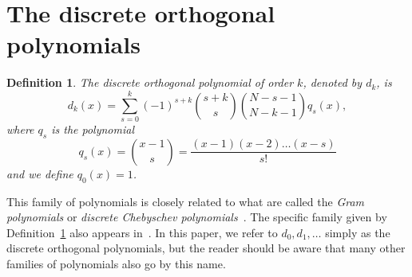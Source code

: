 \documentclass[review]{elsarticle}
\newtheorem{definition}{Definition}
\begin{document}

\section{The discrete orthogonal polynomials}\label{sec:discr-orth-polyn}

\begin{definition}  \label{def:discreteLegendepolys}
The discrete orthogonal polynomial of order $k$, denoted by $d_k$, is
\[
d_k(x) = \sum_{s=0}^k{(-1)^{s+k}\binom{s+k}{s}\binom{N-s-1}{N-k-1}q_s(x)},
\]
where $q_s$ is the polynomial
\[
q_s(x) = \binom{x-1}{s} = \frac{(x-1)(x-2)\dots(x-s)}{s!}
\]
and we define $q_0(x) = 1$.
\end{definition}
This family of polynomials is closely related to what are called the \emph{Gram polynomials} or \emph{discrete Chebyschev polynomials}~\cite[p. 323]{Bjork_num_methods_least_square_1996}\cite{Chebyshev_discrete_polys1864,Gram_discrete_polys1883}.  The specific family given by Definition~\ref{def:discreteLegendepolys} also appears in~\cite{Eisinberg2007_discerete_otho_poly_equidist}.  In this paper, we refer to $d_0,d_1,\dots$ simply as the discrete orthogonal polynomials, but the reader should be aware that many other families of polynomials also go by this name.  
\end{document}
